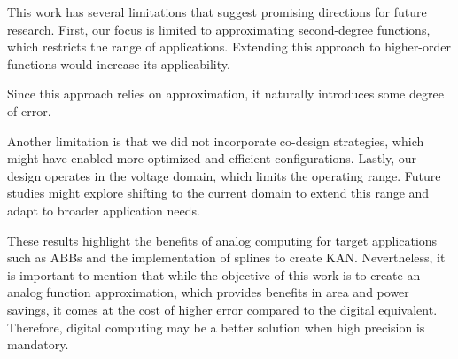 
This work has several limitations that suggest promising directions for future research. 
First, our focus is limited to approximating second-degree functions, which restricts the range of applications. 
Extending this approach to higher-order functions would increase its applicability. 

Since this approach relies on approximation, it naturally introduces some degree of error. 

Another limitation is that we did not incorporate co-design strategies, which might have enabled more optimized and efficient configurations.
Lastly, our design operates in the voltage domain, which limits the operating range. 
Future studies might explore shifting to the current domain to extend this range and adapt to broader application needs.

These results highlight the benefits of analog computing for target applications such as ABBs and the implementation of splines to create KAN. Nevertheless, it is important to mention that while the objective of this work is to create an analog function approximation, which provides benefits in area and power savings, it comes at the cost of higher error compared to the digital equivalent. Therefore, digital computing may be a better solution when high precision is mandatory. 

\vspace{2ex}